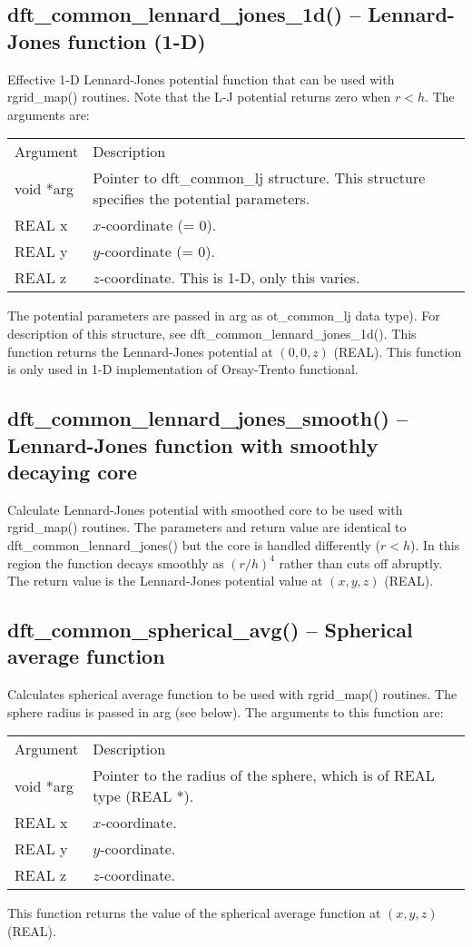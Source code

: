 \documentclass[12pt,letterpaper]{report}
\begin{document}
\subsection{dft\_common\_lennard\_jones\_1d() -- Lennard-Jones function (1-D)}

Effective 1-D Lennard-Jones potential function that can be used with rgrid\_map() routines. Note that the L-J potential returns zero when $r < h$. The arguments are:
\begin{longtable}{p{} p{}}
Argument & Description\\
\cline{1-2}
void *arg & Pointer to dft\_common\_lj structure. This structure specifies the potential parameters.\\
REAL x & $x$-coordinate (= 0).\\
REAL y & $y$-coordinate (= 0).\\
REAL z & $z$-coordinate. This is 1-D, only this varies.\\
\end{longtable}
\noindent 
The potential parameters are passed in arg as ot\_common\_lj data type). For description of this structure, see dft\_common\_lennard\_jones\_1d(). This function returns the Lennard-Jones potential at $(0,0,z)$ (REAL). This function is only used in 1-D implementation of Orsay-Trento functional.

\subsection{dft\_common\_lennard\_jones\_smooth() -- Lennard-Jones function with smoothly decaying core}

Calculate Lennard-Jones potential with smoothed core to be used with rgrid\_map() routines. The parameters and return value are identical to dft\_common\_lennard\_jones() but the core is handled differently ($r < h$). In this region the function decays smoothly as $(r/h)^4$ rather than cuts off abruptly. The return value is the Lennard-Jones potential value at $(x,y,z)$ (REAL).

\subsection{dft\_common\_spherical\_avg() -- Spherical average function}

Calculates spherical average function to be used with rgrid\_map() routines. The sphere radius is passed in arg (see below). The arguments to this function are:
\begin{longtable}{p{} p{}}
Argument & Description\\
\cline{1-2}
void *arg & Pointer to the radius of the sphere, which is of REAL type (REAL *).\\
REAL x & $x$-coordinate.\\
REAL y & $y$-coordinate.\\
REAL z & $z$-coordinate.\\
\end{longtable}
\noindent
This function returns the value of the spherical average function at $(x, y, z)$ (REAL).
\end{document}
